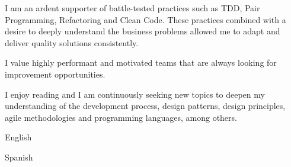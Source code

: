 \documentclass[10pt,letterpaper,ragged2d,withhyper]{altacv}
\begin{document}
\begin{paracol}{2}
I am an ardent supporter of battle-tested practices such as TDD, Pair Programming, Refactoring and Clean Code. These practices combined with a desire to deeply understand the business problems allowed me to adapt and deliver quality solutions consistently.

I value highly performant and motivated teams that are always looking for improvement opportunities.

I enjoy reading and I am continuously seeking new topics to deepen my understanding of the development process, design patterns, design principles, agile methodologies and programming languages, among others.




English\\
\divider

Spanish

\medskip



\divider


\end{paracol}
\end{document}
